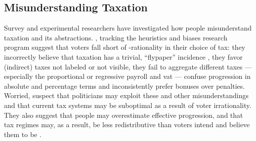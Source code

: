 



\subsection{Misunderstanding Taxation}
Survey and experimental researchers have investigated how people misunderstand taxation and its abstractions.
\cite{McCafferyBaron2003}, tracking the heuristics and biases research program \citep{KahnemanEtAl1982} suggest that voters fall short of \citeauthor{VonNeumannMorgenstern1944}-rationality in their choice of tax:
they incorrectly believe that taxation has a trivial, ``flypaper'' incidence \citep{McCafferyBaron2004b}, they favor (indirect) taxes not labeled or not visible, they fail to aggregate different taxes --- especially the proportional or regressive \gls{payroll} and \gls{vat} --- confuse progression in absolute and percentage terms and inconsistently prefer bonuses over penalties.
Worried, \cite{McCafferyBaron2004} suspect that politicians may exploit these and other misunderstandings and that current tax systems may be suboptimal as a result of voter irrationality.
They also suggest that people may overestimate effective progression, and that tax regimes may, as a result, be less redistributive than voters intend and believe them to be \citep{McCafferyBaron2004}.

